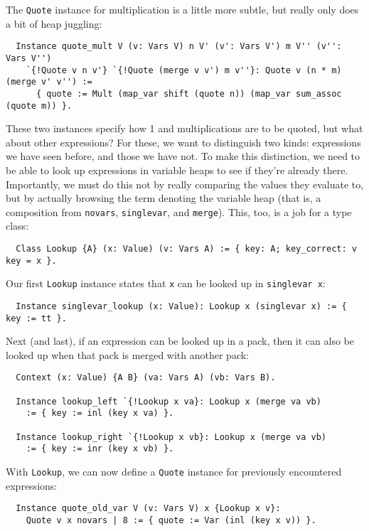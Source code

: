 \documentclass[a4paper,10pt,runningheads]{llncs}
\begin{document}
The \lstinline|Quote| instance for multiplication is a little more subtle, but really only does a bit of heap juggling:
\begin{lstlisting}
  Instance quote_mult V (v: Vars V) n V' (v': Vars V') m V'' (v'': Vars V'')
    `{!Quote v n v'} `{!Quote (merge v v') m v''}: Quote v (n * m) (merge v' v'') :=
      { quote := Mult (map_var shift (quote n)) (map_var sum_assoc (quote m)) }.
\end{lstlisting}

These two instances specify how 1 and multiplications are to be quoted, but what about other expressions? For these, we want to distinguish two kinds: expressions we have seen before, and those we have not. To make this distinction, we need to be able to look up expressions in variable heaps to see if they're already there. Importantly, we must do this not by really comparing the values they evaluate to, but by actually browsing the term denoting the variable heap (that is, a composition from \lstinline|novars|, \lstinline|singlevar|, and \lstinline|merge|). This, too, is a job for a type class:
\begin{lstlisting}
  Class Lookup {A} (x: Value) (v: Vars A) := { key: A; key_correct: v key = x }.
\end{lstlisting}
Our first \lstinline|Lookup| instance states that \lstinline|x| can be looked up in \lstinline|singlevar x|:
\begin{lstlisting}
  Instance singlevar_lookup (x: Value): Lookup x (singlevar x) := { key := tt }.
\end{lstlisting}
Next (and last), if an expression can be looked up in a pack, then it can also be looked up when that pack is merged with another pack:
\begin{lstlisting}
  Context (x: Value) {A B} (va: Vars A) (vb: Vars B).

  Instance lookup_left `{!Lookup x va}: Lookup x (merge va vb)
    := { key := inl (key x va) }.

  Instance lookup_right `{!Lookup x vb}: Lookup x (merge va vb)
    := { key := inr (key x vb) }.
\end{lstlisting}

With \lstinline|Lookup|, we can now define a \lstinline|Quote| instance for previously encountered expressions:
\begin{lstlisting}
  Instance quote_old_var V (v: Vars V) x {Lookup x v}:
    Quote v x novars | 8 := { quote := Var (inl (key x v)) }.
\end{lstlisting}
\end{document}
